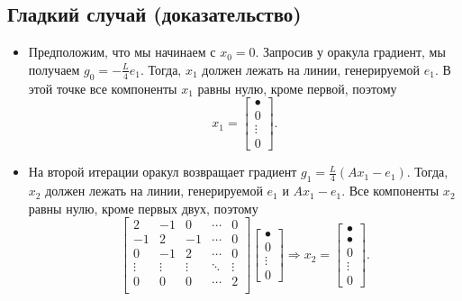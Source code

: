 \documentclass[
  russian,
  letterpaper,
  DIV=11,
  numbers=noendperiod]{scrartcl}
\providecommand{\tightlist}{%
  \setlength{\itemsep}{0pt}\setlength{\parskip}{0pt}}
\begin{document}
\subsection{Гладкий случай
(доказательство)}\label{ux433ux43bux430ux434ux43aux438ux439-ux441ux43bux443ux447ux430ux439-ux434ux43eux43aux430ux437ux430ux442ux435ux43bux44cux441ux442ux432ux43e}

\begin{itemize}
\tightlist
\item
  Предположим, что мы начинаем с \(x_0 = 0\). Запросив у оракула
  градиент, мы получаем \(g_0 = -\tfrac{L}{4}e_1\). Тогда, \(x_1\)
  должен лежать на линии, генерируемой \(e_1\). В этой точке все
  компоненты \(x_1\) равны нулю, кроме первой, поэтому \[
    x_1 = \begin{bmatrix} \bullet \\ 0 \\ \vdots \\ 0 \end{bmatrix}.
    \]
\item
  На второй итерации оракул возвращает градиент
  \(g_1 = \tfrac{L}{4}\left(Ax_1 - e_1\right)\). Тогда, \(x_2\) должен
  лежать на линии, генерируемой \(e_1\) и \(Ax_1 - e_1\). Все компоненты
  \(x_2\) равны нулю, кроме первых двух, поэтому \[
    \begin{bmatrix}
        2 & -1 & 0  & \cdots & 0 \\
        -1 & 2 & -1 & \cdots & 0 \\
        0 & -1 & 2 & \cdots & 0 \\
        \vdots & \vdots & \vdots & \ddots & \vdots \\
        0 & 0 & 0 & \cdots & 2  \\
    \end{bmatrix} \begin{bmatrix} \bullet \\ 0 \\ \vdots \\ 0 \end{bmatrix} \Rightarrow x_2 = \begin{bmatrix} \bullet \\ \bullet \\ 0 \\ \vdots \\ 0 \end{bmatrix}.
    \]
\end{itemize}
\end{document}
